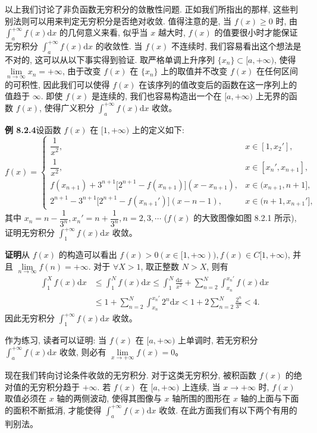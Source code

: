 \documentclass[UTF8, 12pt, fontset=fandol, oneside]{ctexart}
\begin{document}
以上我们讨论了非负函数无穷积分的敛散性问题. 正如我们所指出的那样, 这些判别法则可以用来判定无穷积分是否绝对收敛. 值得注意的是, 当 $f(x)\geq0$ 时, 由 $\int_a^{+\infty}f(x)\mathrm dx$ 的几何意义来看, 似乎当 $x$ 越大时, $f(x)$ 的值要很小时才能保证无穷积分 $\int_a^{+\infty}f(x)\mathrm dx$ 的收敛性. 当 $f(x)$ 不连续时, 我们容易看出这个想法是不对的, 这可以从以下事实得到验证. 取严格单调上升序列 $\{x_n\}\subset[a,+\infty)$, 使得 $\lim\limits_{n\to\infty}x_n=+\infty$, 由于改变 $f(x)$ 在 $\{x_n\}$ 上的取值并不改变 $f(x)$ 在任何区间的可积性, 因此我们可以使得 $f(x)$ 在该序列的值改变后的函数在这一序列上的值趋于 $\infty$. 即使 $f(x)$ 是连续的, 我们也容易构造出一个在 $[a,+\infty)$ 上无界的函数 $f(x)$, 使得广义积分 $\int_a^{+\infty}f(x)\mathrm dx$ 收敛。

\noindent\textbf{例 8.2.4}\quad 设函数 $f(x)$ 在 $[1,+\infty)$ 上的定义如下:
\[
  f(x)=
  \begin{cases}
    \dfrac1{x^2}, & x\in[1,x_2'],\\
    \dfrac1{x^2}, & x\in[x_n',x_{n+1}],\\
    f(x_{n+1})+3^{n+1}\bigl[2^{n+1}-f(x_{n+1})\bigr](x-x_{n+1}), & x\in(x_{n+1},n+1],\\
    2^{n+1}-3^{n+1}\bigl[2^{n+1}-f(x_{n+1}')\bigr](x-n-1), & x\in(n+1,x_{n+1}'],
  \end{cases}
\]
其中 $x_n=n-\dfrac1{3^n},x_n'=n+\dfrac1{3^n},n=2,3,\cdots$ ($f(x)$ 的大致图像如图 8.2.1 所示), 证明无穷积分 $\int_1^{+\infty}f(x)\mathrm dx$ 收敛。

\noindent\textbf{证明}\quad 从 $f(x)$ 的构造可以看出 $f(x)>0(x\in[1,+\infty)), f(x)\in C[1,+\infty)$, 并且 $\lim\limits_{n\to\infty}f(n)=+\infty$. 对于 $\forall X>1$, 取正整数 $N>X$, 则有
\[
\begin{aligned}
  \int_1^X f(x)\mathrm dx
  &\leq
  \int_1^N f(x)\mathrm dx
  \leq
  \int_1^N\frac{\mathrm dx}{x^2}
  +
  \sum_{n=2}^N\int_{x_n}^{x_n'}f(x)\mathrm dx\\
  &\leq
  1+\sum_{n=2}^N\int_{x_n}^{x_n'}2^n\mathrm dx
  <
  1+2\sum_{n=2}^N\frac{2^n}{3^n}<4.
\end{aligned}
\]
因此无穷积分 $\int_1^{+\infty}f(x)\mathrm dx$ 收敛。

作为练习, 读者可以证明: 当 $f(x)$ 在 $[a,+\infty)$ 上单调时, 若无穷积分 $\int_a^{+\infty}f(x)\mathrm dx$ 收敛, 则必有 $\lim\limits_{x\to+\infty}f(x)=0$。

现在我们转向讨论条件收敛的无穷积分. 对于这类无穷积分, 被积函数 $f(x)$ 的绝对值的无穷积分趋于 $+\infty$. 若 $f(x)$ 在 $[a,+\infty)$ 上连续, 当 $x\to+\infty$ 时, $f(x)$ 取值必须在 $x$ 轴的两侧波动, 使得其图像与 $x$ 轴所围的图形在 $x$ 轴的上面与下面的面积不断抵消, 才能使得 $\int_a^{+\infty}f(x)\mathrm dx$ 收敛. 在此方面我们有以下两个有用的判别法。
\end{document}
